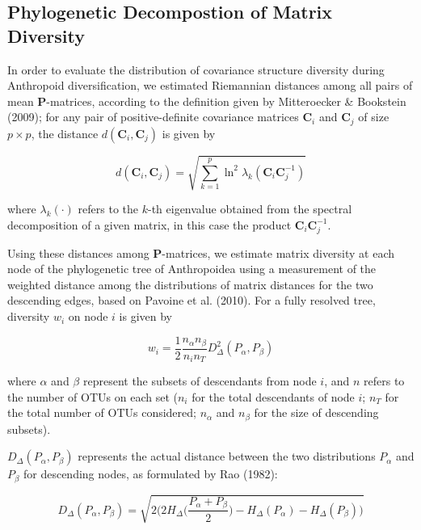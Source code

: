 \documentclass[12pt,twoside]{report}
\begin{document}
\subsection{Phylogenetic Decompostion of Matrix
Diversity}\label{phylogenetic-decompostion-of-matrix-diversity}

In order to evaluate the distribution of covariance structure diversity
during Anthropoid diversification, we estimated Riemannian distances
among all pairs of mean $\mathbf{P}$-matrices, according to the
definition given by Mitteroecker \& Bookstein (2009); for any pair of
positive-definite covariance matrices $\mathbf{C}_i$ and $\mathbf{C}_j$
of size $p \times p$, the distance $d(\mathbf{C}_i, \mathbf{C}_j)$ is
given by

\begin{equation}
d(\mathbf{C}_i, \mathbf{C}_j) = \sqrt{\sum_{k = 1}^p \ln^2 \lambda_k(\mathbf{C}_i\mathbf{C}_j^{-1})}
\label{eq:riemdist}
\end{equation}

where $\lambda_k(\cdot)$ refers to the $k$-th eigenvalue obtained from
the spectral decomposition of a given matrix, in this case the product
$\mathbf{C}_i\mathbf{C}_j^{-1}$.

Using these distances among $\mathbf{P}$-matrices, we estimate matrix
diversity at each node of the phylogenetic tree of Anthropoidea using a
measurement of the weighted distance among the distributions of matrix
distances for the two descending edges, based on Pavoine et al. (2010).
For a fully resolved tree, diversity $w_i$ on node $i$ is given by

\begin{equation}
w_i = \frac{1}{2} \frac{n_\alpha n_\beta} {n_i n_T} D_{\Delta}^2(P_\alpha, P_\beta)
\label{eq:div}
\end{equation}

where $\alpha$ and $\beta$ represent the subsets of descendants from
node $i$, and $n$ refers to the number of OTUs on each set ($n_i$ for
the total descendants of node $i$; $n_T$ for the total number of OTUs
considered; $n_\alpha$ and $n_\beta$ for the size of descending
subsets).

$D_{\Delta}(P_\alpha, P_\beta)$ represents the actual distance between
the two distributions $P_\alpha$ and $P_\beta$ for descending nodes, as
formulated by Rao (1982):

\begin{equation}
D_{\Delta} (P_\alpha, P_\beta) =
\sqrt{2 \bigg( 2 H_{\Delta} \bigg( \frac{P_\alpha + P_\beta}{2} \bigg) -
H_{\Delta}(P_\alpha) - H_{\Delta}(P_\beta) \bigg)}
\label{eq:distdist}
\end{equation}
\end{document}
